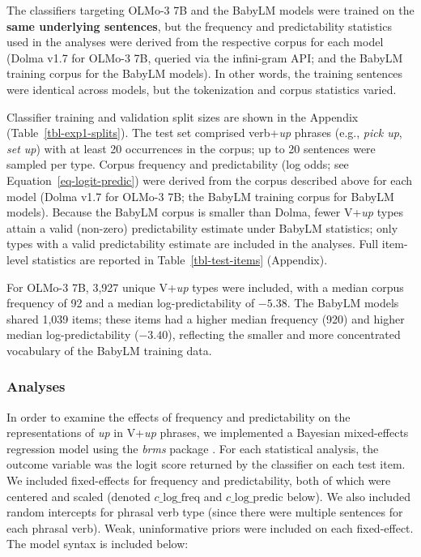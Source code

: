 \documentclass[11pt]{article}
\begin{document}
The classifiers targeting OLMo-3 7B and the BabyLM models were trained
on the \textbf{same underlying sentences}, but the frequency and
predictability statistics used in the analyses were derived from the
respective corpus for each model (Dolma v1.7 for OLMo-3 7B, queried via
the infini-gram API; and the BabyLM training corpus for the BabyLM
models). In other words, the training sentences were identical across
models, but the tokenization and corpus statistics varied.

Classifier training and validation split sizes are shown in the Appendix
(Table~\ref{tbl-exp1-splits}). The test set comprised verb+\emph{up}
phrases (e.g., \emph{pick up}, \emph{set up}) with at least 20
occurrences in the corpus; up to 20 sentences were sampled per type.
Corpus frequency and predictability (log odds; see
Equation~\ref{eq-logit-predic}) were derived from the corpus described
above for each model (Dolma v1.7 for OLMo-3 7B; the BabyLM training
corpus for BabyLM models). Because the BabyLM corpus is smaller than
Dolma, fewer V+\emph{up} types attain a valid (non-zero) predictability
estimate under BabyLM statistics; only types with a valid predictability
estimate are included in the analyses. Full item-level statistics are
reported in Table~\ref{tbl-test-items} (Appendix).

For OLMo-3 7B, 3,927 unique V+\emph{up} types were included, with a
median corpus frequency of 92 and a median log-predictability of
\(-5.38\). The BabyLM models shared 1,039 items; these items had a
higher median frequency (920) and higher median log-predictability
(\(-3.40\)), reflecting the smaller and more concentrated vocabulary of
the BabyLM training data.

\subsubsection{Analyses}\label{analyses}

In order to examine the effects of frequency and predictability on the
representations of \emph{up} in V+\emph{up} phrases, we implemented a
Bayesian mixed-effects regression model using the \emph{brms} package
\citep{burknerBrmsPackageBayesian2017}. For each statistical analysis,
the outcome variable was the logit score returned by the classifier on
each test item. We included fixed-effects for frequency and
predictability, both of which were centered and scaled (denoted
\(c\_\text{log\_freq}\) and \(c\_\text{log\_predic}\) below). We also
included random intercepts for phrasal verb type (since there were
multiple sentences for each phrasal verb). Weak, uninformative priors
were included on each fixed-effect. The model syntax is included below:
\end{document}
